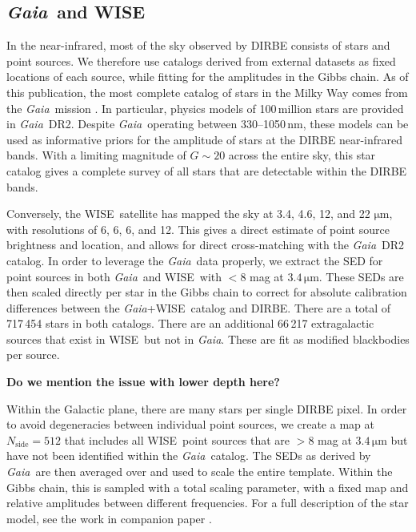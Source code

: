 \documentclass{aa}
\def\GAIA{\textit{Gaia}}
\def\gaia{\textit{Gaia}}
\def\Gaia{\textit{Gaia}}
\def\WISE{WISE}
\begin{document}
\subsection{\GAIA\ and \WISE}

In the near-infrared, most of the sky observed by DIRBE consists of stars and point sources. We therefore use catalogs derived from external datasets as fixed locations of each source, while fitting for the amplitudes in the Gibbs chain. As of this publication, the most complete catalog of stars in the  Milky Way comes from the \Gaia\ mission \citep{gaia:2016,gaia:2018}. In particular, physics models of 100\,million stars are provided in \Gaia\ DR2. Despite \Gaia\ operating between 330--1050\,nm, these models can be used as informative priors for the amplitude of stars at the DIRBE near-infrared bands. With a limiting magnitude of $G\sim20$ across the entire sky, this star catalog gives a complete survey of all stars that are detectable within the DIRBE bands.

Conversely, the \WISE\ satellite \citep{wright:2010} has mapped the sky at 3.4, 4.6, 12, and 22 $\mathrm{\mu m}$, with resolutions of 6, 6, 6, and 12. This gives a direct estimate of point source brightness and location, and allows for direct cross-matching with the \GAIA\ DR2 catalog. In order to leverage the \gaia\ data properly, we extract the SED for point sources in both \gaia\ and \WISE\ with $<8$ mag at $3.4\,\mathrm{\mu m}$. These SEDs are then scaled directly per star in the Gibbs chain to correct for absolute calibration differences between the \gaia+\WISE\ catalog and DIRBE. There are a total of 717\,454 stars in both catalogs. There are an additional 66\,217 extragalactic sources that exist in \WISE\ but not in \gaia. These are fit as modified blackbodies per source.

\textbf{Do we mention the issue with lower depth here?}

Within the Galactic plane, there are many stars per single DIRBE pixel. In order to avoid degeneracies between individual point sources, we create a map at $N_\mathrm{side}=512$ that includes all \WISE\ point sources that are $>8$ mag at $3.4\,\mathrm{\mu m}$ but have not been identified within the \gaia\ catalog. The SEDs as derived by \gaia\ are then averaged over and used to scale the entire template. Within the Gibbs chain, this is sampled with a total scaling parameter, with a fixed map and relative amplitudes between different frequencies. For a full description of the star model, see the work in companion paper \citet{CG02_04}.
\end{document}
